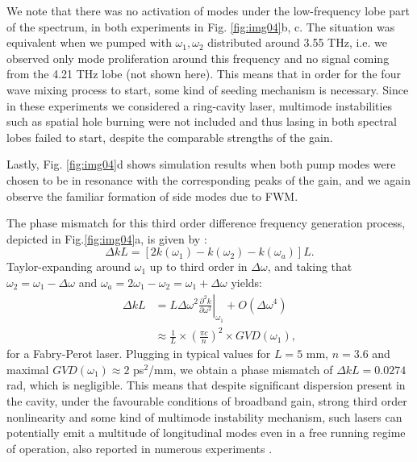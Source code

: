 \documentclass[twocolumn,secnumarabic,amssymb, nobibnotes, aps, prd]{revtex4-1}
\def\p{\partial}
\begin{document}
{			We note that there was no activation of modes under the low-frequency lobe part of the spectrum, in both experiments in Fig. \ref{fig:img04}b, c. The situation was equivalent when we pumped with $\omega_1,\omega_2$ distributed around 3.55 THz, i.e. we observed only mode proliferation around this frequency and no signal coming from the 4.21 THz lobe (not shown here). This means that in order for the four wave mixing process to start, some kind of seeding mechanism is necessary. Since in these experiments we considered a ring-cavity laser, multimode instabilities such as spatial hole burning \cite{gordon2008multimode} were not included and thus lasing in both spectral lobes failed to start, despite the comparable strengths of the gain. 
			
			Lastly, Fig. \ref{fig:img04}d shows simulation results when both pump modes were chosen to be in resonance with the corresponding peaks of the gain, and we again observe the familiar formation of side modes due to FWM.
			
			The phase mismatch for this third order difference frequency generation process, depicted in Fig.\ref{fig:img04}a, is given by \cite{butcher1991elements}:
			\begin{equation}
			\Delta k L = \left [2k(\omega_1) - k(\omega_2)-k(\omega_a) \right ]L. 
			\end{equation}
			Taylor-expanding around $\omega_1$ up to third order in $\Delta \omega $, and taking that $\omega_2 = \omega_1 - \Delta \omega$ and $\omega_a =2\omega_1-\omega_2 =\omega_1 + \Delta \omega$ yields:
			\begin{align}
			\Delta k L & = L\Delta \omega^2 \left.\frac{\p^2 k}{\p \omega^2}\right|_{\omega_1} + O(\Delta \omega^4) \nonumber \\
			&\approx \frac{1}{L}\times \left(\frac{\pi c}{n}\right)^2\times GVD(\omega_1),
			\end{align}
			for a Fabry-Perot laser. Plugging in typical values for $L = 5$ mm, $n=3.6$ and maximal $GVD(\omega_1) \approx 2 $ ps$^2$/mm, we obtain a phase mismatch of $\Delta k L = 0.0274$ rad, which is negligible. This means that despite significant dispersion present in the cavity, under the favourable conditions of broadband gain, strong third order nonlinearity and some kind of multimode instability mechanism, such lasers can potentially emit a multitude of longitudinal modes even in a free running regime of operation, also reported in numerous experiments \cite{wienold2014evidence,burghoff2014terahertz,hugi2012mid,rosch2015octave}.
			
}
\end{document}
